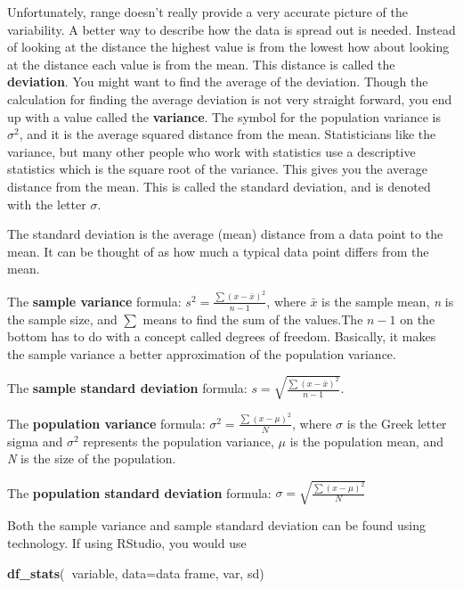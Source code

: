\documentclass[
]{book}
\newenvironment{Shaded}{\begin{snugshade}}{\end{snugshade}}
\newcommand{\DataTypeTok}[1]{\textcolor[rgb]{0.13,0.29,0.53}{#1}}
\newcommand{\KeywordTok}[1]{\textcolor[rgb]{0.13,0.29,0.53}{\textbf{#1}}}
\newcommand{\NormalTok}[1]{#1}
\newcommand{\OperatorTok}[1]{\textcolor[rgb]{0.81,0.36,0.00}{\textbf{#1}}}
\begin{document}
Unfortunately, range doesn't really provide a very accurate picture of the variability. A better way to describe how the data is spread out is needed. Instead of looking at the distance the highest value is from the lowest how about looking at the distance each value is from the mean. This distance is called the \textbf{deviation}. You might want to find the average of the deviation. Though the calculation for finding the average deviation is not very straight forward, you end up with a value called the \textbf{variance}. The symbol for the population variance is \(\sigma^2\), and it is the average squared distance from the mean. Statisticians like the variance, but many other people who work with statistics use a descriptive statistics which is the square root of the variance. This gives you the average distance from the mean. This is called the standard deviation, and is denoted with the letter \(\sigma\).

The standard deviation is the average (mean) distance from a data point to the mean. It can be thought of as how much a typical data point differs from the mean.

The \textbf{sample variance} formula:
\(s^2=\frac{\sum\left(x-\bar{x}\right)^2}{n-1}\), where \(\bar{x}\) is the sample mean, \emph{n} is the sample size, and \(\sum{}\) means to find the sum of the values.The \(n-1\) on the bottom has to do with a concept called degrees of freedom. Basically, it makes the sample variance a better approximation of the population variance.

The \textbf{sample standard deviation} formula:
\(s=\sqrt{ \frac{\sum\left(x-\bar{x}\right)^2}{n-1}}\).

The \textbf{population variance} formula:
\(\sigma^2 = \frac{\sum\left(x-\mu \right)^2}{N}\), where \(\sigma\) is the Greek letter sigma and \(\sigma^2\) represents the population variance, \(\mu\) is the population mean, and \emph{N} is the size of the population.

The \textbf{population standard deviation} formula:
\(\sigma =\sqrt{ \frac{\sum\left(x-\mu \right)^2}{N}}\)

Both the sample variance and sample standard deviation can be found using technology. If using RStudio, you would use

\begin{Shaded}
\begin{Highlighting}[]
\KeywordTok{df_stats}\NormalTok{(}\OperatorTok{~}\NormalTok{variable, }\DataTypeTok{data=}\NormalTok{data frame, var, sd)}
\end{Highlighting}
\end{Shaded}
\end{document}
